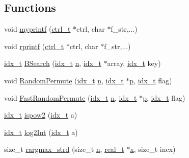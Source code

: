\subsection*{Functions}
\begin{DoxyCompactItemize}
\item 
void \hyperlink{a00873_a22d1af3ffc94aed89b6809987bd6146a}{myprintf} (\hyperlink{a00742}{ctrl\+\_\+t} $\ast$ctrl, char $\ast$f\+\_\+str,...)
\item 
void \hyperlink{a00873_af0e0a700a8e7d63ed242d2b0c1944e2a}{rprintf} (\hyperlink{a00742}{ctrl\+\_\+t} $\ast$ctrl, char $\ast$f\+\_\+str,...)
\item 
\hyperlink{a00876_aaa5262be3e700770163401acb0150f52}{idx\+\_\+t} \hyperlink{a00873_a650e5c092bae3edafdbdfd11340fe0a3}{B\+Search} (\hyperlink{a00876_aaa5262be3e700770163401acb0150f52}{idx\+\_\+t} \hyperlink{a00623_a781a04ab095280f838ff3eb0e51312e0}{n}, \hyperlink{a00876_aaa5262be3e700770163401acb0150f52}{idx\+\_\+t} $\ast$array, \hyperlink{a00876_aaa5262be3e700770163401acb0150f52}{idx\+\_\+t} key)
\item 
void \hyperlink{a00873_a7ebb1732f10c7ca924a48c718e4355c2}{Random\+Permute} (\hyperlink{a00876_aaa5262be3e700770163401acb0150f52}{idx\+\_\+t} \hyperlink{a00623_a781a04ab095280f838ff3eb0e51312e0}{n}, \hyperlink{a00876_aaa5262be3e700770163401acb0150f52}{idx\+\_\+t} $\ast$\hyperlink{a00614_a1e0420801cd5156c14e085b87a4945f5}{p}, \hyperlink{a00876_aaa5262be3e700770163401acb0150f52}{idx\+\_\+t} flag)
\item 
void \hyperlink{a00873_aad45cf489b69af118f0277011c3deb71}{Fast\+Random\+Permute} (\hyperlink{a00876_aaa5262be3e700770163401acb0150f52}{idx\+\_\+t} \hyperlink{a00623_a781a04ab095280f838ff3eb0e51312e0}{n}, \hyperlink{a00876_aaa5262be3e700770163401acb0150f52}{idx\+\_\+t} $\ast$\hyperlink{a00614_a1e0420801cd5156c14e085b87a4945f5}{p}, \hyperlink{a00876_aaa5262be3e700770163401acb0150f52}{idx\+\_\+t} flag)
\item 
\hyperlink{a00876_aaa5262be3e700770163401acb0150f52}{idx\+\_\+t} \hyperlink{a00873_a6f869752374991778c2a1cd580188b2a}{ispow2} (\hyperlink{a00876_aaa5262be3e700770163401acb0150f52}{idx\+\_\+t} a)
\item 
\hyperlink{a00876_aaa5262be3e700770163401acb0150f52}{idx\+\_\+t} \hyperlink{a00873_a341adcab69220ea551779c0d43511648}{log2\+Int} (\hyperlink{a00876_aaa5262be3e700770163401acb0150f52}{idx\+\_\+t} a)
\item 
size\+\_\+t \hyperlink{a00873_ac5394e770bf9a444b47e90d6eead478a}{rargmax\+\_\+strd} (size\+\_\+t \hyperlink{a00623_a781a04ab095280f838ff3eb0e51312e0}{n}, \hyperlink{a00876_a1924a4f6907cc3833213aba1f07fcbe9}{real\+\_\+t} $\ast$\hyperlink{a00605_ac98c3bb25378222646e977292011625f}{x}, size\+\_\+t incx)

\end{DoxyCompactItemize}
